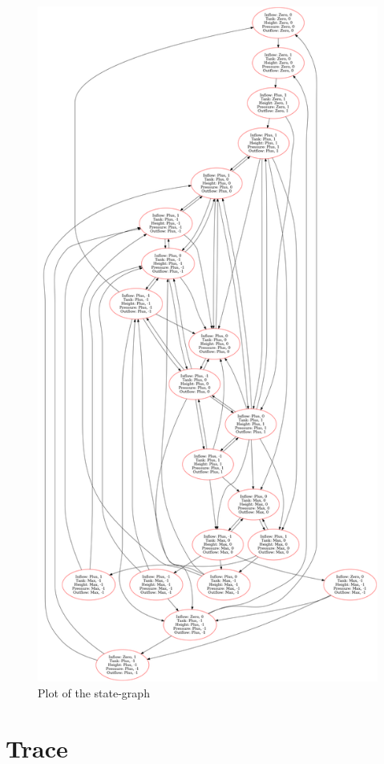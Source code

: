 \documentclass[a4paper]{article}
\begin{document}
\begin{figure}[H]\label{state-graph}
\centering
\includegraphics[width=\textwidth]{result.png}
\caption{Plot of the state-graph}
\end{figure}


\section{Trace}
\end{document}
